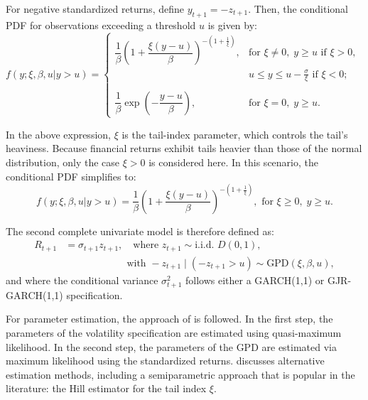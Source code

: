For negative standardized returns, define $y_{t+1} = -z_{t+1}$. Then, the conditional PDF for observations exceeding a threshold $u$ is given by:
\begin{equation}
f(y; \xi, \beta, u | y>u) =
\begin{cases}
\dfrac{1}{\beta} \left(1 + \dfrac{\xi(y - u)}{\beta} \right)^{-\left(1 + \frac{1}{\xi}\right)}, & \text{for } \xi \ne 0, \; y \ge u \text{ if } \xi > 0,\; \\ & u \leq y \leq u- \frac{\sigma}{\xi} \text{ if } \xi < 0 ;\\
\\
\dfrac{1}{\beta} \exp\left(-\dfrac{y - u}{\beta}\right), & \text{for } \xi = 0,\; y \geq u.
\end{cases}
\label{eq:3.5}
\end{equation}

In the above expression, $\xi$ is the tail-index parameter, which controls the tail’s heaviness. Because financial returns exhibit tails heavier than those of the normal distribution, only the case $\xi > 0$ is considered here. In this scenario, the conditional PDF simplifies to:
\[
f(y; \xi, \beta, u | y>u) =
\dfrac{1}{\beta} \left(1 + \dfrac{\xi(y - u)}{\beta} \right)^{-\left(1 + \frac{1}{\xi}\right)}, \text{ for } \xi \ge 0, \; y \ge u.
\]

The second complete univariate model is therefore defined as:
\begin{equation}
\begin{aligned}
R_{t+1} &= \sigma_{t+1} z_{t+1}, \quad \text{where } z_{t+1} \sim \text{i.i.d. } D(0,1), \\
&\quad \quad  \quad  \quad  \quad  \quad \ \text{with } -z_{t+1} \mid (-z_{t+1} > u) \sim \text{GPD}(\xi, \beta, u),
\end{aligned}
\label{eq:3.6}
\end{equation}
and where the conditional variance $\sigma^2_{t+1}$ follows either a GARCH(1,1) or GJR-GARCH(1,1) specification.

For parameter estimation, the approach of  is followed. In the first step, the parameters of the volatility specification are estimated using quasi-maximum likelihood. In the second step, the parameters of the GPD are estimated via maximum likelihood using the standardized returns.  discusses alternative estimation methods, including a semiparametric approach that is popular in the literature: the Hill estimator for the tail index $\xi$.

